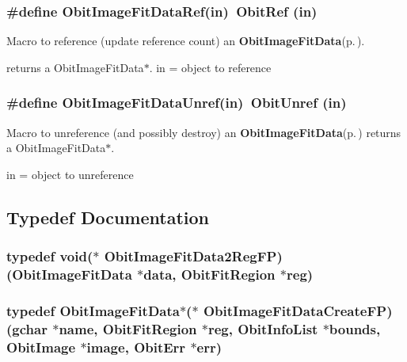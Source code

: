 \subsubsection{\setlength{\rightskip}{0pt plus 5cm}\#define Obit\-Image\-Fit\-Data\-Ref(in)\ Obit\-Ref (in)}\label{ObitImageFitData_8h_a1}


Macro to reference (update reference count) an {\bf Obit\-Image\-Fit\-Data}{\rm (p.\,\pageref{structObitImageFitData})}. 

returns a Obit\-Image\-Fit\-Data$\ast$. in = object to reference 
\subsubsection{\setlength{\rightskip}{0pt plus 5cm}\#define Obit\-Image\-Fit\-Data\-Unref(in)\ Obit\-Unref (in)}\label{ObitImageFitData_8h_a0}


Macro to unreference (and possibly destroy) an {\bf Obit\-Image\-Fit\-Data}{\rm (p.\,\pageref{structObitImageFitData})} returns a Obit\-Image\-Fit\-Data$\ast$. 

in = object to unreference 

\subsection{Typedef Documentation}
\subsubsection{\setlength{\rightskip}{0pt plus 5cm}typedef void($\ast$ {\bf Obit\-Image\-Fit\-Data2Reg\-FP})({\bf Obit\-Image\-Fit\-Data} $\ast$data, {\bf Obit\-Fit\-Region} $\ast$reg)}\label{ObitImageFitData_8h_a5}


\subsubsection{\setlength{\rightskip}{0pt plus 5cm}typedef {\bf Obit\-Image\-Fit\-Data}$\ast$($\ast$ {\bf Obit\-Image\-Fit\-Data\-Create\-FP})(gchar $\ast$name, {\bf Obit\-Fit\-Region} $\ast$reg, {\bf Obit\-Info\-List} $\ast$bounds, {\bf Obit\-Image} $\ast$image, {\bf Obit\-Err} $\ast$err)}\label{ObitImageFitData_8h_a4}


